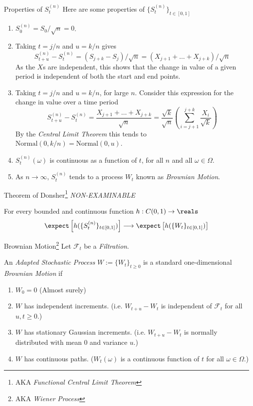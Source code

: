 \documentclass[11pt,a4paper]{article}
\begin{document}
  \begin{proposition}{Properties of $S_t^{(n)}$}
    Here are some properties of $\{S_t^{(n)}\}_{t\in[0,1]}$
    \begin{enumerate}
      \item $S_0^{(n)}=S_0/\sqrt{n}=0$.
      \item Taking $t=j/n$ and $u=k/n$ gives
      \[ S_{t+u}^{(n)}-S_t^{(n)}=(S_{j+k}-S_j)/\sqrt{n}=(X_{j+1}+\dots+X_{j+k})/\sqrt{n} \]
      As the $X$s are independent, this shows that the change in value of a given period is independent of both the start and end points.
      \item Taking $t=j/n$ and $u=k/n$, for large $n$. Consider this expression for the change in value over a time period
      \[ S_{t+u}^{(n)}-S_t^{(n)}=\frac{X_{j+1}+\dots+X_{j+k}}{\sqrt{n}}=\frac{\sqrt{k}}{\sqrt{n}}\left(\sum_{i=j+1}^{j+k}\frac{X_i}{\sqrt{k}}\right) \]
      By the \textit{Central Limit Theorem} this tends to $\text{Normal}\left(0,k/n\right)=\text{Normal}\left(0,u\right)$.
      \item $S_t^{(n)}(\omega)$ is continuous as a function of $t$, for all $n$ and all $\omega\in\Omega$.
      \item As $n\to\infty$, $S_t^{(n)}$ tends to a process $W_t$ known as \textit{Brownian Motion}.
    \end{enumerate}
  \end{proposition}

  \begin{theorem}{Theorem of Donsher\footnote{AKA \textit{Functional Central Limit Theorem}}}
    \textit{NON-EXAMINABLE}
    \par For every bounded and continuous function $h:C(0,1)\to\reals$
    \[ \expect\left[h(\{S_t^{(n)}\}_{t\in[0,1]})\right]\longrightarrow\expect\left[h(\{W_t\}_{t\in[0,1]})\right] \]
  \end{theorem}

  \begin{definition}{Brownian Motion\footnote{AKA \textit{Wiener Process}}}\label{def_brownian_motion}
    Let $\mathcal{F}_t$ be a \textit{Filtration}.
    \par An \textit{Adapted Stochastic Process} $W:=\{W_t\}_{t\geq0}$ is a standard one-dimensional \textit{Brownian Motion} if
    \begin{enumerate}
      \item $W_0=0$ (Almost surely)
      \item $W$ has independent increments. (i.e. $W_{t+u}-W_t$ is independent of $\mathcal{F}_t$ for all $u,t\geq0$.)
      \item $W$ has stationary Gaussian increments. (i.e. $W_{t+u}-W_t$ is normally distributed with mean 0 and variance $u$.)
      \item $W$ has continuous paths. ($W_t(\omega)$ is a continuous function of $t$ for all $\omega\in\Omega$.)
    \end{enumerate}
  \end{definition}
\end{document}

